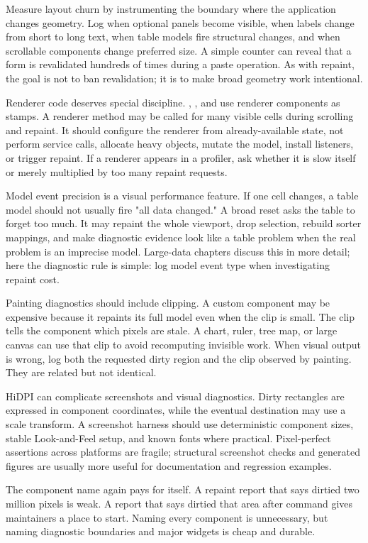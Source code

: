 Measure layout churn by instrumenting the boundary where the application changes geometry. Log when optional panels become visible, when labels change from short to long text, when table models fire structural changes, and when scrollable components change preferred size. A simple counter can reveal that a form is revalidated hundreds of times during a paste operation. As with repaint, the goal is not to ban revalidation; it is to make broad geometry work intentional.

Renderer code deserves special discipline. , , and  use renderer components as stamps. A renderer method may be called for many visible cells during scrolling and repaint. It should configure the renderer from already-available state, not perform service calls, allocate heavy objects, mutate the model, install listeners, or trigger repaint. If a renderer appears in a profiler, ask whether it is slow itself or merely multiplied by too many repaint requests.

Model event precision is a visual performance feature. If one cell changes, a table model should not usually fire "all data changed." A broad reset asks the table to forget too much. It may repaint the whole viewport, drop selection, rebuild sorter mappings, and make diagnostic evidence look like a table problem when the real problem is an imprecise model. Large-data chapters discuss this in more detail; here the diagnostic rule is simple: log model event type when investigating repaint cost.

Painting diagnostics should include clipping. A custom component may be expensive because it repaints its full model even when the clip is small. The  clip tells the component which pixels are stale. A chart, ruler, tree map, or large canvas can use that clip to avoid recomputing invisible work. When visual output is wrong, log both the requested dirty region and the clip observed by painting. They are related but not identical.

HiDPI can complicate screenshots and visual diagnostics. Dirty rectangles are expressed in component coordinates, while the eventual destination may use a scale transform. A screenshot harness should use deterministic component sizes, stable Look-and-Feel setup, and known fonts where practical. Pixel-perfect assertions across platforms are fragile; structural screenshot checks and generated figures are usually more useful for documentation and regression examples.

The component name again pays for itself. A repaint report that says  dirtied two million pixels is weak. A report that says  dirtied that area after command  gives maintainers a place to start. Naming every component is unnecessary, but naming diagnostic boundaries and major widgets is cheap and durable.

